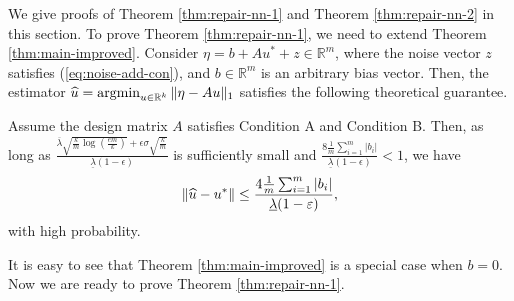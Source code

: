 We give proofs of Theorem \ref{thm:repair-nn-1} and Theorem \ref{thm:repair-nn-2} in this section.
To prove Theorem \ref{thm:repair-nn-1}, we need to extend Theorem \ref{thm:main-improved}. Consider $\eta=b+Au^*+z\in\mathbb{R}^m$, where the noise vector $z$ satisfies (\ref{eq:noise-add-con}), and $b\in\mathbb{R}^m$ is an arbitrary bias vector. Then, the estimator $\widehat{u}=\mathop{\rm argmin}_{u\in\mathbb{R}^k}\|\eta-Au\|_1$ satisfies the following theoretical guarantee.
\begin{thm}\label{thm:robust-reg-b}
Assume the design matrix $A$ satisfies Condition A and Condition B. Then, as long as $\frac{\overline{\lambda}\sqrt{\frac{k}{m}\log\left(\frac{em}{k}\right)}+\epsilon\sigma\sqrt{\frac{k}{m}}}{\underline{\lambda}(1-\epsilon)}$ is sufficiently small and $\frac{8\frac{1}{m}\sum_{i=1}^m|b_i|}{\underline{\lambda}(1-\epsilon)}<1$, we have
$$\|\widehat{u}-u^*\|\leq \frac{4\frac{1}{m}\sum_{i=1}^m|b_i|}{\underline{\lambda}(1-\varepsilon)},$$
with high probability.
\end{thm}
It is easy to see that Theorem \ref{thm:main-improved} is a special case when $b=0$.
Now we are ready to prove Theorem \ref{thm:repair-nn-1}.
